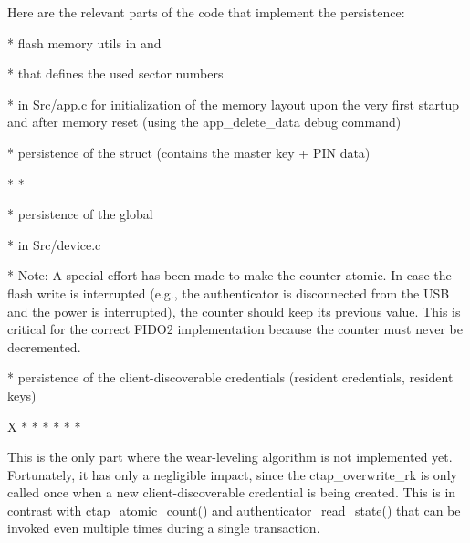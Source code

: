 Here are the relevant parts of the code that implement the persistence:

\begitems

* flash memory utils in  and 

*  that defines the used sector numbers

*  in Src/app.c for initialization of the memory layout upon the very first startup and after memory reset (using the app_delete_data debug command)

* persistence of the  struct (contains the master key + PIN data)

\begitems
* 
* 
\enditems

* persistence of the global 

\begitems

*  in Src/device.c

* Note: A special effort has been made to make the counter atomic. In case the flash write is interrupted (e.g., the authenticator is disconnected from the USB and the power is interrupted), the counter should keep its previous value. This is critical for the correct FIDO2 implementation because the counter must never be decremented.

\enditems

* persistence of the client-discoverable credentials (resident credentials, resident keys)

\begitems \style X
* 
* 
* 
* 
* 
* 

This is the only part where the wear-leveling algorithm is not implemented yet.
Fortunately, it has only a negligible impact, since the ctap_overwrite_rk is only called once when a new client-discoverable credential is being created. This is in contrast with ctap_atomic_count() and authenticator_read_state() that can be invoked even multiple times during a single transaction.

\enditems

\enditems





